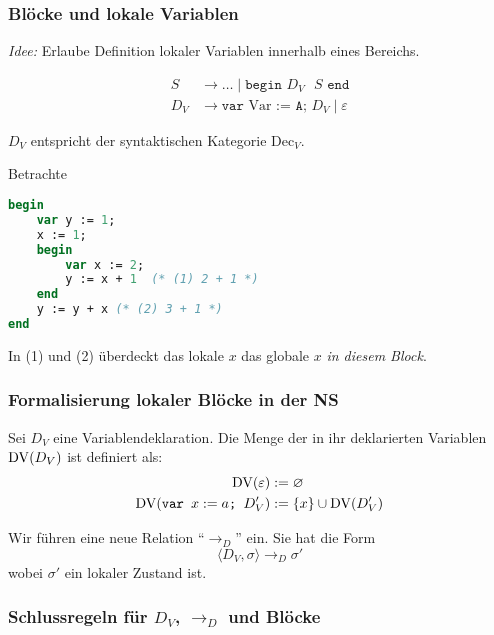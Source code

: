 \subsubsection{Blöcke und lokale Variablen}

\emph{Idee:} Erlaube Definition lokaler Variablen innerhalb eines Bereichs.

\begin{align*}
    S & \to \dots \;\vert\; \texttt{begin $D_V$ $S$ end} \\
    D_V & \to \texttt{var} \text{ Var } \texttt{:= A; $D_V$} \;\vert\; \varepsilon
\end{align*}

$D_V$ entspricht der syntaktischen Kategorie Dec$_V$.

\begin{example}
Betrachte
\begin{lstlisting}[language=Pascal]
begin
    var y := 1;
    x := 1;
    begin
        var x := 2;
        y := x + 1  (* (1) 2 + 1 *)
    end
    y := y + x (* (2) 3 + 1 *)
end
\end{lstlisting}

In (1) und (2) überdeckt das lokale $x$ das globale $x$ \emph{in diesem Block}.
\end{example}



\subsubsection{Formalisierung lokaler Blöcke in der NS}

\begin{definition}
    Sei $D_V$ eine Variablendeklaration. Die Menge der in ihr deklarierten Variablen $\operatorname{DV}(D_V)$ ist definiert als:
    \begin{align*}
        \operatorname{DV}(\varepsilon) & := \varnothing \\
        \operatorname{DV}(\texttt{var } x := a \texttt{; } D_V') & := \{ x \} \cup \operatorname{DV}(D_V')
    \end{align*}

    Wir führen eine neue Relation ``$\to_D$'' ein. Sie hat die Form \[
        \langle D_V, \sigma \rangle \to_D \sigma'
    \]
    wobei $\sigma'$ ein lokaler Zustand ist.
\end{definition}



\subsubsection{Schlussregeln für $D_V$, $\to_D$ und Blöcke}

